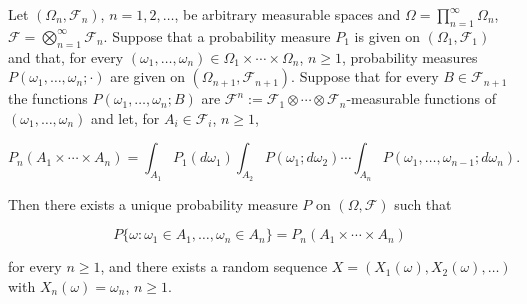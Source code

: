 Let $(\Omega_n, \mathcal{F}_n)$, $n = 1, 2, \ldots$, be arbitrary measurable spaces and $\Omega = \prod_{n=1}^{\infty} \Omega_n$, $\mathcal{F} = \bigotimes_{n=1}^{\infty} \mathcal{F}_n$. Suppose that a probability measure $P_1$ is given on $(\Omega_1, \mathcal{F}_1)$ and that, for every $(\omega_1, \ldots, \omega_n) \in \Omega_1 \times \cdots \times \Omega_n$, $n \geq 1$, probability measures $P(\omega_1, \ldots, \omega_n; \cdot)$ are given on $(\Omega_{n+1}, \mathcal{F}_{n+1})$. Suppose that for every $B \in \mathcal{F}_{n+1}$ the functions $P(\omega_1, \ldots, \omega_n; B)$ are $\mathcal{F}^n := \mathcal{F}_1 \otimes \cdots \otimes \mathcal{F}_n$-measurable functions of $(\omega_1, \ldots, \omega_n)$ and let, for $A_i \in \mathcal{F}_i$, $n \geq 1$,

$$P_n(A_1 \times \cdots \times A_n) = \int_{A_1} P_1(d\omega_1) \int_{A_2} P(\omega_1; d\omega_2) \cdots \int_{A_n} P(\omega_1, \ldots, \omega_{n-1}; d\omega_n).$$

Then there exists a unique probability measure $P$ on $(\Omega, \mathcal{F})$ such that

$$P\{\omega : \omega_1 \in A_1, \ldots, \omega_n \in A_n\} = P_n(A_1 \times \cdots \times A_n)$$

for every $n \geq 1$, and there exists a random sequence $X = (X_1(\omega), X_2(\omega), \ldots)$ with $X_n(\omega) = \omega_n$, $n \geq 1$.
